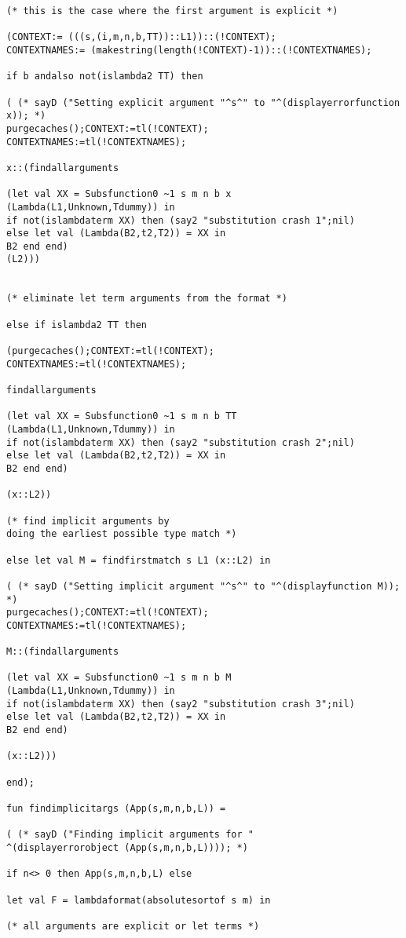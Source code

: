 \documentclass[12pt]{article}
\begin{document}
\begin{verbatim}
(* this is the case where the first argument is explicit *)

(CONTEXT:= (((s,(i,m,n,b,TT))::L1))::(!CONTEXT);
CONTEXTNAMES:= (makestring(length(!CONTEXT)-1))::(!CONTEXTNAMES);

if b andalso not(islambda2 TT) then 

( (* sayD ("Setting explicit argument "^s^" to "^(displayerrorfunction x)); *)
purgecaches();CONTEXT:=tl(!CONTEXT);
CONTEXTNAMES:=tl(!CONTEXTNAMES);

x::(findallarguments 

(let val XX = Subsfunction0 ~1 s m n b x 
(Lambda(L1,Unknown,Tdummy)) in
if not(islambdaterm XX) then (say2 "substitution crash 1";nil)
else let val (Lambda(B2,t2,T2)) = XX in
B2 end end)
(L2)))


(* eliminate let term arguments from the format *)

else if islambda2 TT then 

(purgecaches();CONTEXT:=tl(!CONTEXT);
CONTEXTNAMES:=tl(!CONTEXTNAMES);

findallarguments 

(let val XX = Subsfunction0 ~1 s m n b TT
(Lambda(L1,Unknown,Tdummy)) in
if not(islambdaterm XX) then (say2 "substitution crash 2";nil)
else let val (Lambda(B2,t2,T2)) = XX in
B2 end end)

(x::L2))

(* find implicit arguments by 
doing the earliest possible type match *)

else let val M = findfirstmatch s L1 (x::L2) in

( (* sayD ("Setting implicit argument "^s^" to "^(displayfunction M)); *)
purgecaches();CONTEXT:=tl(!CONTEXT);
CONTEXTNAMES:=tl(!CONTEXTNAMES);

M::(findallarguments 

(let val XX = Subsfunction0 ~1 s m n b M
(Lambda(L1,Unknown,Tdummy)) in
if not(islambdaterm XX) then (say2 "substitution crash 3";nil)
else let val (Lambda(B2,t2,T2)) = XX in
B2 end end)

(x::L2)))

end);

fun findimplicitargs (App(s,m,n,b,L)) =

( (* sayD ("Finding implicit arguments for "
^(displayerrorobject (App(s,m,n,b,L)))); *)

if n<> 0 then App(s,m,n,b,L) else

let val F = lambdaformat(absolutesortof s m) in

(* all arguments are explicit or let terms *)


\end{verbatim}
\end{document}
